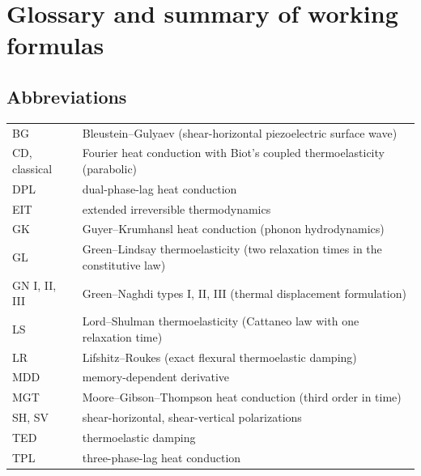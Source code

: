 \section{Glossary and summary of working formulas}\label{app:glossary}

\subsection{Abbreviations}
\begin{center}\small
\begin{tabular}{@{}p{2.4cm}p{12cm}@{}}\toprule
BG & Bleustein--Gulyaev (shear-horizontal piezoelectric surface wave)\\
CD, classical & Fourier heat conduction with Biot's coupled thermoelasticity (parabolic)\\
DPL & dual-phase-lag heat conduction\\
EIT & extended irreversible thermodynamics\\
GK & Guyer--Krumhansl heat conduction (phonon hydrodynamics)\\
GL & Green--Lindsay thermoelasticity (two relaxation times in the constitutive law)\\
GN I, II, III & Green--Naghdi types I, II, III (thermal displacement formulation)\\
LS & Lord--Shulman thermoelasticity (Cattaneo law with one relaxation time)\\
LR & Lifshitz--Roukes (exact flexural thermoelastic damping)\\
MDD & memory-dependent derivative\\
MGT & Moore--Gibson--Thompson heat conduction (third order in time)\\
SH, SV & shear-horizontal, shear-vertical polarizations\\
TED & thermoelastic damping\\
TPL & three-phase-lag heat conduction\\
\bottomrule\end{tabular}
\end{center}


